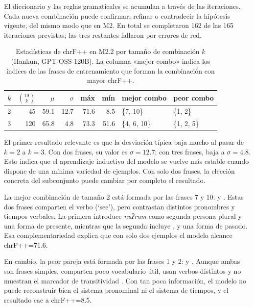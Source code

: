 El diccionario y las reglas gramaticales se acumulan a través de las iteraciones. Cada nueva combinación puede confirmar, refinar o contradecir la hipótesis vigente, del mismo modo que en M2. En total se completaron 162 de las 165 iteraciones previstas; las tres restantes fallaron por errores de red.

\begin{table}[h]
	\centering
	\caption{Estadísticas de chrF++ en M2.2 por tamaño de combinación $k$ (Hankun, GPT-OSS-120B). La columna «mejor combo» indica los índices de las frases de entrenamiento que forman la combinación con mayor chrF++.}
	\label{tab:m22_stats}
	\begin{tabular}{crrrrrll}
		\toprule
		$k$ & $\binom{10}{k}$ & $\mu$ & $\sigma$ & máx & mín
		& mejor combo & peor combo \\
		\midrule
		2 & 45  & 59.1 & 12.7 & 71.6 &  8.5
		& \{7, 10\} & \{1, 2\} \\
		3 & 120 & 65.8 &  4.8 & 73.3 & 51.6
		& \{4, 6, 10\} & \{1, 2, 5\} \\
		\bottomrule
	\end{tabular}
\end{table}

El primer resultado relevante es que la desviación típica baja mucho al pasar de $k=2$ a $k=3$. Con dos frases, su valor es $\sigma=12.7$; con tres frases, baja a $\sigma=4.8$. Esto indica que el aprendizaje inductivo del modelo se vuelve más estable cuando dispone de una mínima variedad de ejemplos. Con solo dos frases, la elección concreta del subconjunto puede cambiar por completo el resultado.

La mejor combinación de tamaño 2 está formada por las frases 7 y 10:  y . Estas dos frases comparten el verbo  (`see'), pero contrastan distintos pronombres y tiempos verbales. La primera introduce \textit{nuʔrum} como segunda persona plural y una forma de presente, mientras que la segunda incluye ,  y una forma de pasado. Esa complementariedad explica que con solo dos ejemplos el modelo alcance chrF++=71.6.

En cambio, la peor pareja está formada por las frases 1 y 2:  y . Aunque ambas son frases simples, comparten poco vocabulario útil, usan verbos distintos y no muestran el marcador de transitividad . Con tan poca información, el modelo no puede reconstruir bien el sistema pronominal ni el sistema de tiempos, y el resultado cae a chrF++=8.5.

